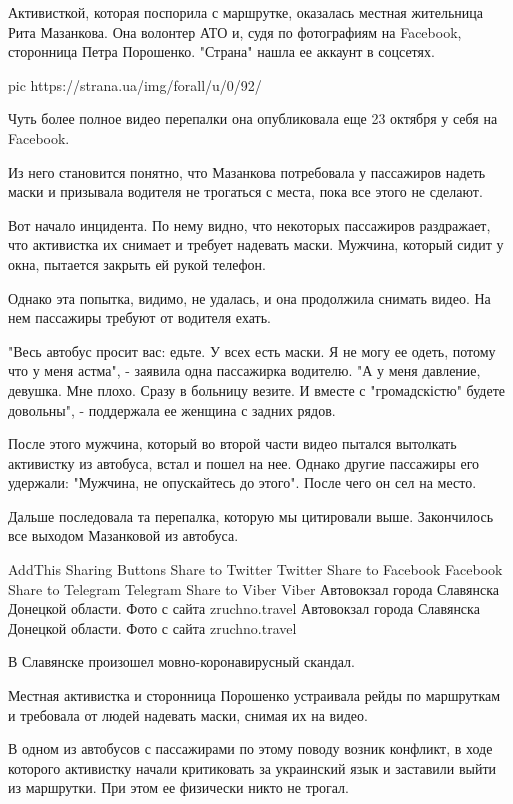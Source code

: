 Активисткой, которая поспорила с маршрутке, оказалась местная жительница Рита
Мазанкова. Она волонтер АТО и, судя по фотографиям на Facebook, сторонница
Петра Порошенко. "Страна" нашла ее аккаунт в соцсетях. 

\ifcmt
pic https://strana.ua/img/forall/u/0/92/%
\fi

Чуть более полное видео перепалки она опубликовала еще 23 октября у себя на
Facebook.

Из него становится понятно, что Мазанкова потребовала у пассажиров надеть маски
и призывала водителя не трогаться с места, пока все этого не сделают.

Вот начало инцидента. По нему видно, что некоторых пассажиров раздражает, что
активистка их снимает и требует надевать маски. Мужчина, который сидит у окна,
пытается закрыть ей рукой телефон. 

Однако эта попытка, видимо, не удалась, и она продолжила снимать видео. На нем
пассажиры требуют от водителя ехать. 

"Весь автобус просит вас: едьте. У всех есть маски. Я не могу ее одеть, потому
что у меня астма", - заявила одна пассажирка водителю. "А у меня давление,
девушка. Мне плохо. Сразу в больницу везите. И вместе с "громадскістю" будете
довольны", - поддержала ее женщина с задних рядов. 

После этого мужчина, который во второй части видео пытался вытолкать активистку
из автобуса, встал и пошел на нее. Однако другие пассажиры его удержали:
"Мужчина, не опускайтесь до этого". После чего он сел на место. 

Дальше последовала та перепалка, которую мы цитировали выше. Закончилось все
выходом Мазанковой из автобуса. 


AddThis Sharing Buttons
Share to Twitter
Twitter
Share to Facebook
Facebook
Share to Telegram
Telegram
Share to Viber
Viber
Автовокзал города Славянска Донецкой области. Фото с сайта zruchno.travel
Автовокзал города Славянска Донецкой области. Фото с сайта zruchno.travel

В Славянске произошел мовно-коронавирусный скандал.

Местная активистка и сторонница Порошенко устраивала рейды по маршруткам и требовала от людей надевать маски, снимая их на видео.

В одном из автобусов с пассажирами по этому поводу возник конфликт, в ходе которого активистку начали критиковать за украинский язык и заставили выйти из маршрутки. При этом ее физически никто не трогал. 

